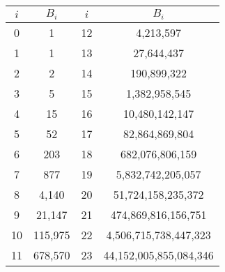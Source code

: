 \begin{table}[H]
\centering
\begin{tabular}[scale = 0.8]{|c|c|c|c|}
\hline
$i$ & $B_i$ & $i$ & $B_i$ \\ \hline
0 & 1 & 12 & 4,213,597 \\ \hline
1 & 1 & 13 & 27,644,437 \\ \hline
2 & 2 & 14 & 190,899,322 \\ \hline
3 & 5 & 15 & 1,382,958,545 \\ \hline
4 & 15 & 16 & 10,480,142,147 \\ \hline
5 & 52 & 17 & 82,864,869,804 \\ \hline
6 & 203 & 18 & 682,076,806,159 \\ \hline
7 & 877 & 19 & 5,832,742,205,057 \\ \hline
8 & 4,140 & 20 & 51,724,158,235,372 \\ \hline
9 & 21,147 & 21 & 474,869,816,156,751 \\ \hline
10 & 115,975 & 22 & 4,506,715,738,447,323 \\ \hline
11 & 678,570 & 23 & 44,152,005,855,084,346 \\ \hline
\end{tabular}
\end{table}
